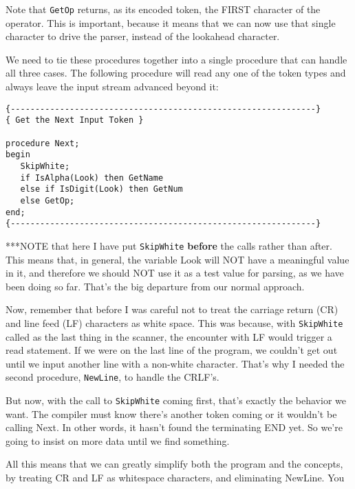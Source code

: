 Note  that  {\tt GetOp}  returns, as  its  encoded  token, the  FIRST character of the operator. This is important, because  it means that we can now use that single character to  drive  the  parser, instead of the lookahead character.

We need to tie these  procedures together into a single procedure that can handle all three  cases. The  following  procedure will read any one of the token types and always leave the input stream advanced beyond it:

\begin{verbatim}
{--------------------------------------------------------------}
{ Get the Next Input Token }

procedure Next;
begin
   SkipWhite;
   if IsAlpha(Look) then GetName
   else if IsDigit(Look) then GetNum
   else GetOp;
end;
{--------------------------------------------------------------}
\end{verbatim}

***NOTE  that  here  I have put {\tt SkipWhite} {\bfseries before} the calls rather
than after. This means that, in general, the variable  Look will NOT have a meaningful value in it, and therefore  we  should  NOT use it as a test value for parsing, as we have been doing so far. That's the big departure from our normal approach.

Now, remember that before I was careful not to treat the carriage return (CR) and line  feed  (LF) characters as white space. This was  because, with  {\tt SkipWhite}  called  as the last thing in  the scanner, the encounter with  LF  would  trigger a read statement. If we were on the last line of the program, we  couldn't get out until we input another line with a non-white  character. That's why I needed the second procedure, {\tt NewLine}, to handle the CRLF's.

But now, with the call  to {\tt SkipWhite} coming first, that's exactly the behavior we want. The  compiler  must know there's another token coming or it wouldn't be calling Next. In other words, it hasn't found the terminating  END  yet. So we're going to insist on more data until we find something.

All this means that we can greatly simplify both the  program and the concepts, by treating CR and LF as whitespace characters, and eliminating NewLine. You  can  do  that  simply by modifying the function {\tt IsWhite}:

\begin{verbatim}
{--------------------------------------------------------------}
{ Recognize White Space }

function IsWhite(c: char): boolean;
begin
   IsWhite := c in [' ', TAB, CR, LF];
end;
{--------------------------------------------------------------}
\end{verbatim}

